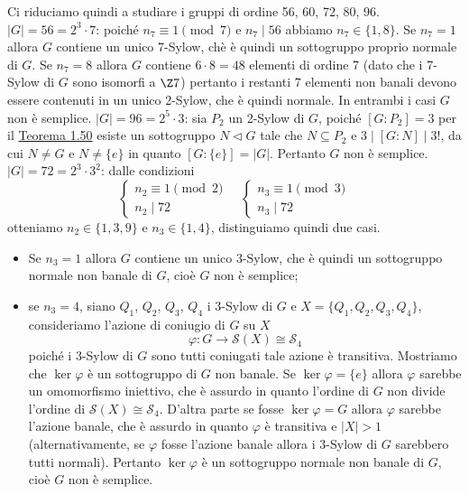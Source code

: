 \documentclass[11pt]{scrartcl}
\begin{document}
Ci riduciamo quindi a studiare i gruppi di ordine 56, 60, 72, 80, 96.
\newline\newline
\underline{$|G| = 56 = 2^3\cdot 7$}: poiché $n_7 \equiv 1 \pmod 7$ e $n_7 \mid 56$ abbiamo
$n_7 \in \{1, 8\}$. Se $n_7 = 1$ allora $G$ contiene un unico 7-Sylow, chè 
è quindi un sottogruppo proprio normale di $G$. Se $n_7 = 8$ allora $G$ contiene
$6\cdot8 = 48$ elementi di ordine 7 (dato che i 7-Sylow di $G$ sono isomorfi a $\Z7$)
pertanto i restanti $7$ elementi non banali devono essere contenuti in un 
unico 2-Sylow, che è quindi normale. In entrambi i casi $G$ non è semplice.
\newline\newline
\underline{$|G| = 96 = 2^5\cdot 3$}: sia $P_2$ un 2-Sylow di $G$, poiché 
$[G:P_2] = 3$ per il \hyperref[teorema1.50]{Teorema 1.50} esiste un sottogruppo
$N \triangleleft G$ tale che $N \subseteq P_2$ e $3 \mid [G:N] \mid 3!$, da cui
$N \neq G$ e $N \neq \{e\}$ in quanto $[G:\{e\}] = |G|$. Pertanto $G$ non 
è semplice.
\newline\newline
\underline{$|G| = 72 = 2^3 \cdot 3^2$}: dalle condizioni 
\[
    \begin{cases}
        n_2 \equiv 1 \pmod 2\\
        n_2 \mid 72
    \end{cases}\quad
    \begin{cases}
        n_3 \equiv 1 \pmod 3\\
        n_3 \mid 72
    \end{cases}
\]
otteniamo $n_2 \in \{1, 3, 9\}$ e $n_3 \in \{1, 4\}$, distinguiamo quindi
due casi.
\begin{itemize}
    \item Se $n_3 = 1$ allora $G$ contiene un unico 3-Sylow, che è quindi un
    sottogruppo normale non banale di $G$, cioè $G$ non è semplice;
    \item se $n_3= 4$, siano $Q_1$, $Q_2$, $Q_3$, $Q_4$ i 3-Sylow di $G$ e 
    $X = \{Q_1, Q_2, Q_3, Q_4\}$, consideriamo l'azione di coniugio di $G$ su $X$
    \[
        \varphi: G\longrightarrow \mathcal{S}(X) \cong \mathcal{S}_4
    \]
    poiché i 3-Sylow di $G$ sono tutti coniugati tale azione è transitiva.
    Mostriamo che $\ker \varphi$ è un sottogruppo di $G$ non banale. Se $\ker\varphi
    = \{e\}$ allora $\varphi$ sarebbe un omomorfismo iniettivo, che è assurdo
    in quanto l'ordine di $G$ non divide l'ordine di $\mathcal{S}(X) \cong \mathcal{S}_4$. D'altra
    parte se fosse $\ker\varphi = G$ allora $\varphi$ sarebbe l'azione banale,
    che è assurdo in quanto $\varphi$ è transitiva e $|X| > 1$ (alternativamente,
    se $\varphi$ fosse l'azione banale allora i 3-Sylow di $G$ sarebbero tutti
    normali). Pertanto $\ker\varphi$ è un sottogruppo normale non banale di $G$,
    cioè $G$ non è semplice.
\end{itemize}
\end{document}
